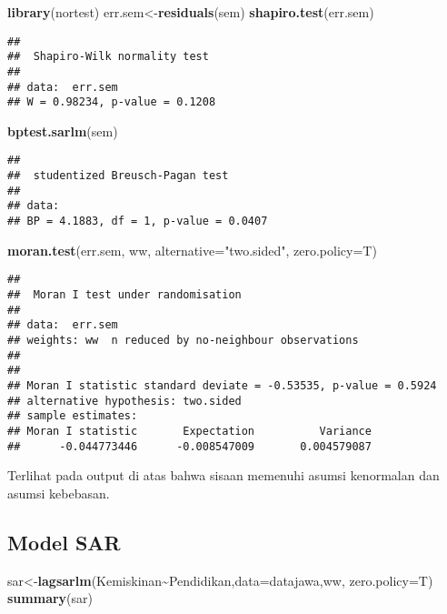 \documentclass[
]{book}
\newenvironment{Shaded}{\begin{snugshade}}{\end{snugshade}}
\newcommand{\DataTypeTok}[1]{\textcolor[rgb]{0.13,0.29,0.53}{#1}}
\newcommand{\KeywordTok}[1]{\textcolor[rgb]{0.13,0.29,0.53}{\textbf{#1}}}
\newcommand{\NormalTok}[1]{#1}
\newcommand{\OperatorTok}[1]{\textcolor[rgb]{0.81,0.36,0.00}{\textbf{#1}}}
\newcommand{\StringTok}[1]{\textcolor[rgb]{0.31,0.60,0.02}{#1}}
\begin{document}
\begin{Shaded}
\begin{Highlighting}[]
\KeywordTok{library}\NormalTok{(nortest)}
\NormalTok{err.sem\textless{}{-}}\KeywordTok{residuals}\NormalTok{(sem)}
\KeywordTok{shapiro.test}\NormalTok{(err.sem)}
\end{Highlighting}
\end{Shaded}

\begin{verbatim}
## 
##  Shapiro-Wilk normality test
## 
## data:  err.sem
## W = 0.98234, p-value = 0.1208
\end{verbatim}

\begin{Shaded}
\begin{Highlighting}[]
\KeywordTok{bptest.sarlm}\NormalTok{(sem)}
\end{Highlighting}
\end{Shaded}

\begin{verbatim}
## 
##  studentized Breusch-Pagan test
## 
## data:  
## BP = 4.1883, df = 1, p-value = 0.0407
\end{verbatim}

\begin{Shaded}
\begin{Highlighting}[]
\KeywordTok{moran.test}\NormalTok{(err.sem, ww, }\DataTypeTok{alternative=}\StringTok{"two.sided"}\NormalTok{, }\DataTypeTok{zero.policy=}\NormalTok{T)}
\end{Highlighting}
\end{Shaded}

\begin{verbatim}
## 
##  Moran I test under randomisation
## 
## data:  err.sem  
## weights: ww  n reduced by no-neighbour observations
##   
## 
## Moran I statistic standard deviate = -0.53535, p-value = 0.5924
## alternative hypothesis: two.sided
## sample estimates:
## Moran I statistic       Expectation          Variance 
##      -0.044773446      -0.008547009       0.004579087
\end{verbatim}

Terlihat pada output di atas bahwa sisaan memenuhi asumsi kenormalan dan asumsi kebebasan.

\hypertarget{model-sar}{%
\subsection{Model SAR}\label{model-sar}}

\begin{Shaded}
\begin{Highlighting}[]
\NormalTok{sar\textless{}{-}}\KeywordTok{lagsarlm}\NormalTok{(Kemiskinan}\OperatorTok{\textasciitilde{}}\NormalTok{Pendidikan,}\DataTypeTok{data=}\NormalTok{datajawa,ww, }\DataTypeTok{zero.policy=}\NormalTok{T)}
\KeywordTok{summary}\NormalTok{(sar)}
\end{Highlighting}
\end{Shaded}
\end{document}
